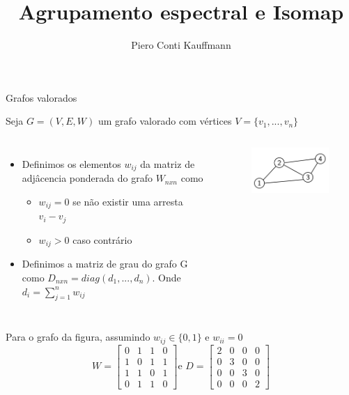 \documentclass[11pt]{beamer}
\author{Piero Conti Kauffmann}
\title{Agrupamento espectral e Isomap}
\institute{IME-USP}
\begin{document}
\begin{frame}{}
\titlepage
\end{frame}

\begin{frame}{Grafos valorados}

Seja $G = (V, E, W)$ um grafo valorado com vértices $V = \{v_1, ..., v_n\}$

\vspace{0.1cm}

\begin{columns}


\begin{itemize}

\item Definimos os elementos $w_{ij}$ da matriz de adjâcencia ponderada do grafo $W_{nxn}$ como

\begin{itemize}
\item $w_{ij} = 0$ se não existir uma arresta $v_i-v_j$
\item $w_{ij} > 0$ caso contrário
\end{itemize}

\item Definimos a matriz de grau do grafo G como $D_{nxn} = diag(d_1, ..., d_n)$. Onde $d_i = \sum_{j = 1}^{n} w_{ij}$

\end{itemize}


\begin{figure}
\includegraphics[scale=0.4]{grafo1_pequeno}

\end{figure}

\end{columns}

\vspace{.3cm}

Para o grafo da figura, assumindo $w_{ij} \in \{0, 1\}$ e $w_{ii} = 0$\\
$$ W = \begin{bmatrix}
0 & 1 & 1 & 0 \\ 
1 & 0 & 1 & 1 \\ 
1 & 1 & 0 & 1 \\ 
0 & 1 & 1 & 0
\end{bmatrix} \text{e }D = 
\begin{bmatrix}
2 & 0 & 0 & 0 \\ 
0 & 3 & 0 & 0 \\ 
0 & 0 & 3 & 0 \\ 
0 & 0 & 0 & 2
\end{bmatrix}  $$

\end{frame}
\end{document}
